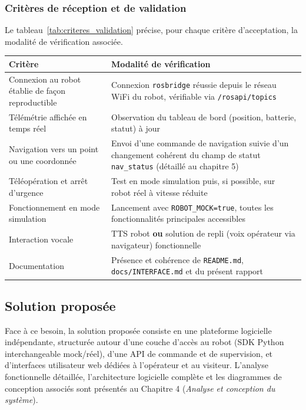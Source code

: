 \newpage
\subsubsection{Critères de réception et de validation}

Le tableau~\ref{tab:criteres_validation} précise, pour chaque critère
d'acceptation, la modalité de vérification associée.

\begin{center}
\begin{tabular}{|p{}|p{}|}
\hline
\textbf{Critère} & \textbf{Modalité de vérification} \\
\hline
Connexion au robot établie de façon reproductible &
Connexion \texttt{rosbridge} réussie depuis le réseau WiFi du robot, vérifiable
via \texttt{/rosapi/topics} \\
\hline
Télémétrie affichée en temps réel &
Observation du tableau de bord (position, batterie, statut) à jour \\
\hline
Navigation vers un point ou une coordonnée &
Envoi d'une commande de navigation suivie d'un changement cohérent du champ
de statut \texttt{nav\_status} (détaillé au chapitre 5) \\
\hline
Téléopération et arrêt d'urgence &
Test en mode simulation puis, si possible, sur robot réel à vitesse réduite \\
\hline
Fonctionnement en mode simulation &
Lancement avec \texttt{ROBOT\_MOCK=true}, toutes les fonctionnalités principales
accessibles \\
\hline
Interaction vocale &
TTS robot \textbf{ou} solution de repli (voix opérateur via navigateur)
fonctionnelle \\
\hline
Documentation &
Présence et cohérence de \texttt{README.md}, \texttt{docs/INTERFACE.md} et du
présent rapport \\
\hline
\end{tabular}
\label{tab:criteres_validation}
\end{center}

\subsection{Solution proposée}

Face à ce besoin, la solution proposée consiste en une plateforme logicielle
indépendante, structurée autour d'une couche d'accès au robot (SDK Python
interchangeable mock/réel), d'une API de commande et de supervision, et
d'interfaces utilisateur web dédiées à l'opérateur et au visiteur. L'analyse
fonctionnelle détaillée, l'architecture logicielle complète et les
diagrammes de conception associés sont présentés au Chapitre 4 (\textit{Analyse
et conception du système}).
\newpage
